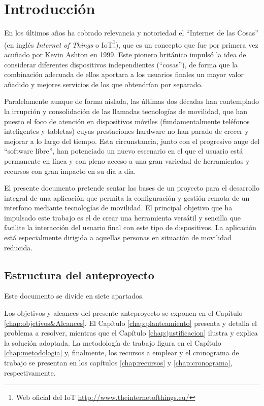\chapter{Introducción}
\label{chap:introduccion}
\onehalfspacing
En los últimos años ha cobrado relevancia y notoriedad el ``Internet de las Cosas'' (en inglés \textit{Internet of Things} o IoT\footnote{Web oficial del IoT \url{http://www.theinternetofthings.eu/}}), que es un concepto que fue por primera vez acuñado por Kevin Ashton en 1999. Este pionero británico impulsó la idea de considerar diferentes dispositivos independientes (``cosas''), de forma que la combinación adecuada de ellos aportara a los usuarios finales un mayor valor añadido y mejores servicios de los que obtendrían por separado.

Paralelamente aunque de forma aislada, las últimas dos décadas han contemplado la irrupción y consolidación de las llamadas tecnologías de movilidad, que han puesto el foco de atención en dispositivos móviles (fundamentalmente teléfonos inteligentes y tabletas) cuyas prestaciones hardware no han parado de crecer y mejorar a lo largo del tiempo. Esta circunstancia, junto con el progresivo auge del ``software libre'', han potenciado un nuevo escenario en el que el usuario está permanente en línea y con pleno acceso a una gran variedad de herramientas y recursos con gran impacto en su día a día.

El presente documento pretende sentar las bases de un proyecto para el desarrollo integral de una aplicación que permita la configuración y gestión remota de un interfono mediante tecnologías de movilidad. El principal objetivo que ha impulsado este trabajo es el de crear una herramienta versátil y sencilla que facilite la interacción del usuario final con este tipo de dispositivos. La aplicación está especialmente dirigida a aquellas personas en situación de movilidad reducida.  

%
\section{Estructura del anteproyecto}
\label{sec:estructura_anteproyecto_deIntro}
Este documento se divide en siete apartados.

Los objetivos y alcances del presente anteproyecto se exponen en el Capítulo \ref{chap:objetivos&Alcances}. El Capítulo \ref{chap:planteamiento} presenta y detalla el problema a resolver, mientras que el Capítulo \ref{chap:justificacion} ilustra y explica la solución adoptada. La metodología de trabajo figura en el Capítulo \ref{chap:metodologia} y, finalmente, los recursos a emplear y el cronograma de trabajo se presentan en los capítulos \ref{chap:recursos} y \ref{chap:cronograma}, respectivamente.

